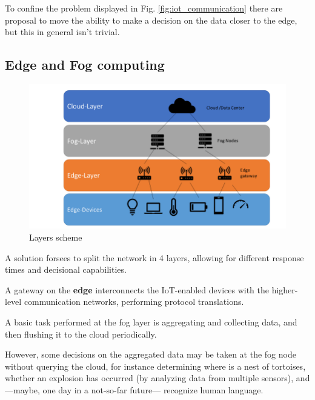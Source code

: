 To confine the problem displayed in Fig. \ref{fig:iot_communication} there are proposal to move the ability to make a decision on the data closer to the edge, but this in general isn't trivial.


\subsection{Edge and Fog computing}
   \begin{figure}[htbp]
      \centering
      \includegraphics{images/fogedge.png}
      \caption{Layers scheme}
      \label{fig:fogedge}
   \end{figure}
A solution forsees to split the network in 4 layers, allowing for different response times and decisional capabilities.

A gateway on the \textbf{edge} interconnects the IoT-enabled devices with the higher-level communication networks, performing protocol translations.

A basic task performed at the fog layer is  aggregating and collecting data, and then flushing it to the cloud periodically.

However, some decisions on the aggregated data may be taken at the fog node without querying the cloud, for instance determining where is a nest of tortoises, whether an explosion has occurred (by analyzing data from multiple sensors), and ---maybe, one day in a not-so-far future--- recognize human language.


